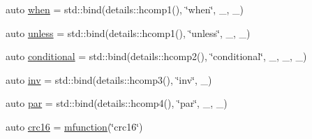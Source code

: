 \begin{DoxyCompactItemize}
\item 
auto \hyperlink{namespacepfq__lang_1_1anonymous__namespace_02default_8hpp_03_a10e1a2f363aa41a978622f322ac6241f}{when} = std\+::bind(details\+::hcomp1(), \char`\"{}when\char`\"{}, \+\_, \+\_)
\item 
auto \hyperlink{namespacepfq__lang_1_1anonymous__namespace_02default_8hpp_03_af01f3831a7b0294b6ffef87a09b481d7}{unless} = std\+::bind(details\+::hcomp1(), \char`\"{}unless\char`\"{}, \+\_, \+\_)
\item 
auto \hyperlink{namespacepfq__lang_1_1anonymous__namespace_02default_8hpp_03_a022d0075edf2fff575b93377aec0c228}{conditional} = std\+::bind(details\+::hcomp2(), \char`\"{}conditional\char`\"{}, \+\_, \+\_, \+\_)
\item 
auto \hyperlink{namespacepfq__lang_1_1anonymous__namespace_02default_8hpp_03_a1a7f650c8e5cb5742c80b68f6144bec1}{inv} = std\+::bind(details\+::hcomp3(), \char`\"{}inv\char`\"{}, \+\_)
\item 
auto \hyperlink{namespacepfq__lang_1_1anonymous__namespace_02default_8hpp_03_aa991781009d861f536522cd68c317317}{par} = std\+::bind(details\+::hcomp4(), \char`\"{}par\char`\"{}, \+\_, \+\_)
\item 
auto \hyperlink{namespacepfq__lang_1_1anonymous__namespace_02default_8hpp_03_aaa12e1daf6bd2719a3b8592e673acf84}{crc16} = \hyperlink{namespacepfq__lang_a47d60e7fc6df739692308276b8f6d4e4}{mfunction}(\char`\"{}crc16\char`\"{})
\end{DoxyCompactItemize}


